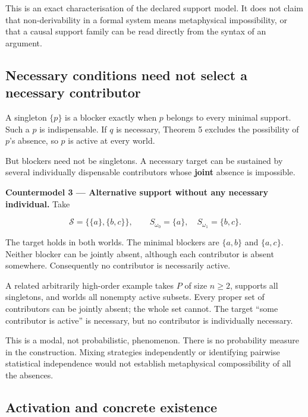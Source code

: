 \documentclass[11pt,a4paper]{article}
\begin{document}
This is an exact characterisation of the declared support model. It does
not claim that non-derivability in a formal system means metaphysical
impossibility, or that a causal support family can be read directly from
the syntax of an argument.

\subsection{Necessary conditions need not select a necessary
contributor}\label{necessary-conditions-need-not-select-a-necessary-contributor}

A singleton \(\{p\}\) is a blocker exactly when \(p\) belongs to every
minimal support. Such a \(p\) is indispensable. If \(q\) is necessary,
Theorem 5 excludes the possibility of \(p\)'s absence, so \(p\) is
active at every world.

But blockers need not be singletons. A necessary target can be sustained
by several individually dispensable contributors whose \textbf{joint}
absence is impossible.

\textbf{Countermodel 3 --- Alternative support without any necessary
individual.} Take

\nopagebreak[4]

\[
\mathscr S=\{\{a\},\{b,c\}\},\qquad
S_{\omega_0}=\{a\},\quad S_{\omega_1}=\{b,c\}.
\]

The target holds in both worlds. The minimal blockers are \(\{a,b\}\)
and \(\{a,c\}\). Neither blocker can be jointly absent, although each
contributor is absent somewhere. Consequently no contributor is
necessarily active.

A related arbitrarily high-order example takes \(P\) of size \(n\ge2\),
supports all singletons, and worlds all nonempty active subsets. Every
proper set of contributors can be jointly absent; the whole set cannot.
The target ``some contributor is active'' is necessary, but no
contributor is individually necessary.

This is a modal, not probabilistic, phenomenon. There is no probability
measure in the construction. Mixing strategies independently or
identifying pairwise statistical independence would not establish
metaphysical compossibility of all the absences.

\subsection{Activation and concrete
existence}\label{activation-and-concrete-existence}
\end{document}

